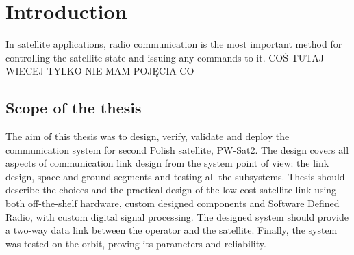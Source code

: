 \chapter{Introduction}
In satellite applications, radio communication is the most important method for controlling the satellite state and issuing any commands to it.
COŚ TUTAJ WIECEJ TYLKO NIE MAM POJĘCIA CO


\section{Scope of the thesis}
The aim of this thesis was to design, verify, validate and deploy the communication system for second Polish satellite, PW-Sat2. The design covers all aspects of communication link design from the system point of view: the link design, space and ground segments and testing all the subsystems. Thesis should describe the choices and the practical design of the low-cost satellite link using both off-the-shelf hardware, custom designed components and Software Defined Radio, with custom digital signal processing. The designed system should provide a two-way data link between the operator and the satellite. Finally, the system was tested on the orbit, proving its parameters and reliability.

